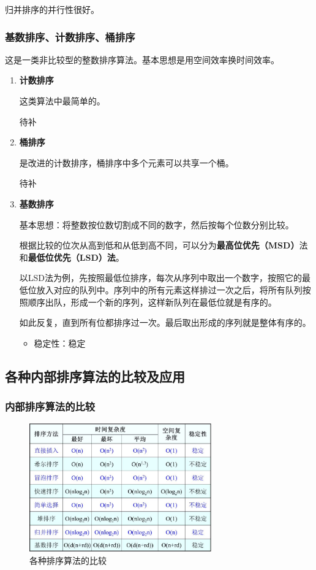 \documentclass[12pt, a4paper, oneside]{ctexart}
\begin{document}
归并排序的并行性很好。

\subsubsection{基数排序、计数排序、桶排序}

这是一类非比较型的整数排序算法。基本思想是用空间效率换时间效率。

\begin{enumerate}
  \item {\bf 计数排序}
  
  这类算法中最简单的。

  待补

  \item {\bf 桶排序}
  
  是改进的计数排序，桶排序中多个元素可以共享一个桶。

  待补

  \item {\bf 基数排序}
  
  基本思想：将整数按位数切割成不同的数字，然后按每个位数分别比较。

  根据比较的位次从高到低和从低到高不同，可以分为\textbf{最高位优先（MSD）}法和\textbf{最低位优先（LSD）法}。

  以LSD法为例，先按照最低位排序，每次从序列中取出一个数字，按照它的最低位放入对应的队列中。序列中的所有元素这样排过一次之后，将所有队列按照顺序出队，形成一个新的序列，这样新队列在最低位就是有序的。

  如此反复，直到所有位都排序过一次。最后取出形成的序列就是整体有序的。

  \begin{itemize}
    \item 稳定性：稳定
  \end{itemize}
\end{enumerate}

\subsection{各种内部排序算法的比较及应用}

\subsubsection{内部排序算法的比较}

\begin{figure}[h]
  \centering
  \includegraphics[width=0.7\textwidth]{./images/sort-compare.jpg}
  \caption{各种排序算法的比较}
\end{figure}
\end{document}
